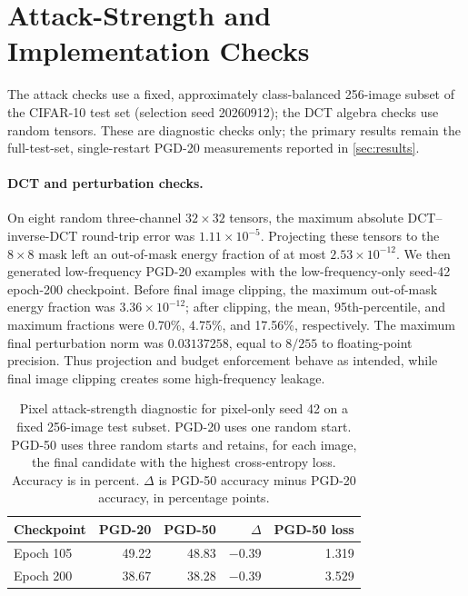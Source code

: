 \documentclass[11pt]{article}
\begin{document}
\FloatBarrier
\section{Attack-Strength and Implementation Checks}
\label{app:checks}
The attack checks use a fixed, approximately class-balanced 256-image subset
of the CIFAR-10 test set (selection seed 20260912); the DCT algebra checks use
random tensors. These are diagnostic checks only; the primary results remain the full-test-set,
single-restart PGD-20 measurements reported in \cref{sec:results}.

\paragraph{DCT and perturbation checks.}
On eight random three-channel $32\times32$ tensors, the maximum absolute DCT--inverse-DCT
round-trip error was $1.11\times10^{-5}$. Projecting these tensors to the
$8\times8$ mask left an out-of-mask energy fraction of at most
$2.53\times10^{-12}$. We then generated low-frequency PGD-20 examples with the
low-frequency-only seed-42 epoch-200 checkpoint. Before final image clipping,
the maximum out-of-mask energy fraction was $3.36\times10^{-12}$; after
clipping, the mean, 95th-percentile, and maximum fractions were 0.70\%,
4.75\%, and 17.56\%, respectively. The maximum final perturbation norm was
$0.03137258$, equal to $8/255$ to floating-point precision. Thus projection
and budget enforcement behave as intended, while final image clipping creates
some high-frequency leakage.

\begin{table}[!htbp]
\centering
\caption{Pixel attack-strength diagnostic for pixel-only seed 42 on a fixed
256-image test subset. PGD-20 uses one random start. PGD-50 uses three random
starts and retains, for each image, the final candidate with the highest
cross-entropy loss. Accuracy is in percent. $\Delta$ is PGD-50 accuracy minus
PGD-20 accuracy, in percentage points.}
\label{tab:attack-strength}
\begin{tabular*}{\linewidth}{@{\extracolsep{\fill}}lrrrr@{}}
\toprule
Checkpoint & PGD-20 & PGD-50 & $\Delta$ & PGD-50 loss \\
\midrule
Epoch 105 & 49.22 & 48.83 & $-0.39$ & 1.319 \\
Epoch 200 & 38.67 & 38.28 & $-0.39$ & 3.529 \\
\bottomrule
\end{tabular*}
\end{table}
\end{document}
